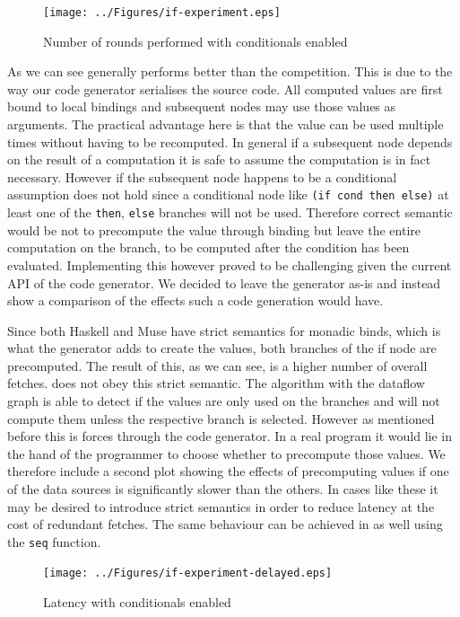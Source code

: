 \begin{figure}
    \texttt{[image: ../Figures/if-experiment.eps]}
    \caption{Number of rounds performed with conditionals enabled}
\end{figure}

As we can see \yauhau{} generally performs better than the competition.
This is due to the way our code generator serialises the source code.
All computed values are first bound to local bindings and subsequent nodes may use those values as arguments.
The practical advantage here is that the value can be used multiple times without having to be recomputed.
In general if a subsequent node depends on the result of a computation it is safe to assume the computation is in fact necessary.
However if the subsequent node happens to be a conditional assumption does not hold since a conditional node like \texttt{(if cond then else)} at least one of the \texttt{then}, \texttt{else} branches will not be used.
Therefore correct semantic would be not to precompute the value through binding but leave the entire computation on the branch, to be computed after the condition has been evaluated.
Implementing this however proved to be challenging given the current API of the code generator.
We decided to leave the generator as-is and instead show a comparison of the effects such a code generation would have.

Since both Haskell and Muse have strict semantics for monadic binds, which is what the generator adds to create the values, both branches of the if node are precomputed.
The result of this, as we can see, is a higher number of overall fetches.
\yauhau{} does not obey this strict semantic. The algorithm with the dataflow graph is able to detect if the values are only used on the branches and will not compute them unless the respective branch is selected.
However as mentioned before this is forces through the code generator.
In a real program it would lie in the hand of the programmer to choose whether to precompute those values.
We therefore include a second plot showing the effects of precomputing values if one of the data sources is significantly slower than the others.
In cases like these it may be desired to introduce strict semantics in order to reduce latency at the cost of redundant fetches.
The same behaviour can be achieved in \yauhau{} as well using the \texttt{seq} function.

\begin{figure}
    \texttt{[image: ../Figures/if-experiment-delayed.eps]}
    \caption{Latency with conditionals enabled}
\end{figure}
